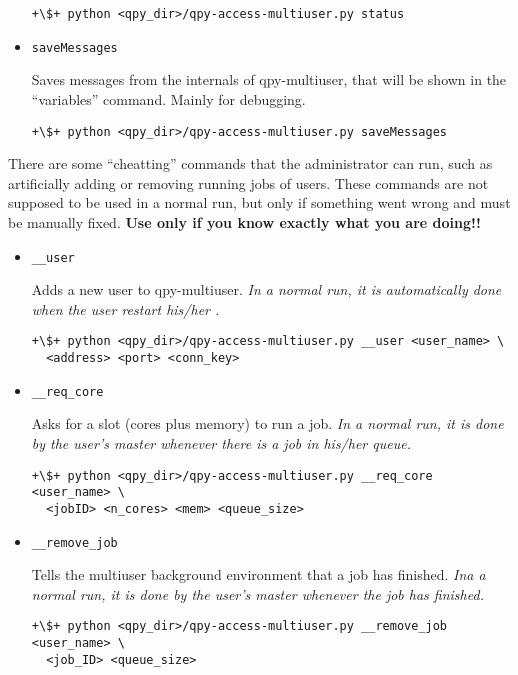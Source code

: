 \documentclass[a4paper,12pt]{article}
\begin{document}
\begin{itemize}
  \begin{lstlisting}[style=BashStyle]
+\$+ python <qpy_dir>/qpy-access-multiuser.py status
  \end{lstlisting}



\item \texttt{saveMessages}

  Saves messages from the internals of qpy-multiuser, that will be shown in the ``variables'' command.
  Mainly for debugging.

  \begin{lstlisting}[style=BashStyle]
+\$+ python <qpy_dir>/qpy-access-multiuser.py saveMessages
  \end{lstlisting}


\end{itemize}

There are some ``cheatting'' commands that the administrator can run, such as artificially adding or removing running jobs of users.
These commands are not supposed to be used in a normal run, but only if something went wrong and must be manually fixed.
\textbf{Use only if you know exactly what you are doing!!}


\begin{itemize}

\item \texttt{\_\_user}

  Adds a new user to qpy-multiuser. \emph{In a normal run, it is automatically done when the user restart his/her \qpy{}.}

  \begin{lstlisting}[style=BashStyle]
+\$+ python <qpy_dir>/qpy-access-multiuser.py __user <user_name> \
  <address> <port> <conn_key>
  \end{lstlisting}


\item \texttt{\_\_req\_core}

  Asks for a slot (cores plus memory) to run a job. \emph{In a normal run, it is done by the user's master whenever there is a job in his/her queue.}
  
\begin{lstlisting}[style=BashStyle]
+\$+ python <qpy_dir>/qpy-access-multiuser.py __req_core <user_name> \
  <jobID> <n_cores> <mem> <queue_size>
\end{lstlisting}

\item \texttt{\_\_remove\_job}

  Tells the multiuser background environment that a job has finished. \emph{Ina a normal run, it is done by the user's master whenever the job has finished.}
  
\begin{lstlisting}[style=BashStyle]
+\$+ python <qpy_dir>/qpy-access-multiuser.py __remove_job <user_name> \
  <job_ID> <queue_size>
\end{lstlisting}

\end{itemize}
\end{document}
